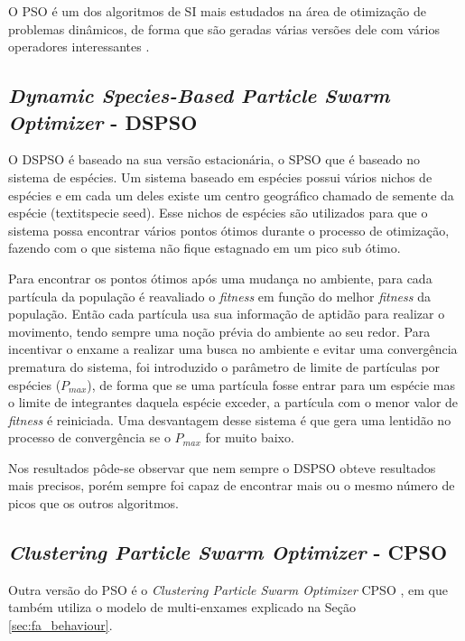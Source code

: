 O PSO é um dos algoritmos de SI mais estudados na área de otimização de problemas dinâmicos, de forma que são geradas várias versões dele com vários operadores interessantes \cite{carlisle2002applying}.

\subsection{\textit{Dynamic Species-Based Particle Swarm Optimizer} - DSPSO}
\label{sec:dspso}

O DSPSO \cite{parrott2006locating} é baseado na sua versão estacionária, o SPSO que é baseado no sistema de espécies. Um sistema baseado em espécies possui vários nichos de espécies e em cada um deles existe um centro geográfico chamado de semente da espécie (textit{specie seed}). Esse nichos de espécies são utilizados para que o sistema possa encontrar vários pontos ótimos durante o processo de otimização, fazendo com o que sistema não fique estagnado em um pico sub ótimo.

Para encontrar os pontos ótimos após uma mudança no ambiente, para cada partícula da população é reavaliado o \textit{fitness} em função do melhor \textit{fitness} da população. Então cada partícula usa sua informação de aptidão para realizar o movimento, tendo sempre uma noção prévia do ambiente ao seu redor. Para incentivar o enxame a realizar uma busca no ambiente e evitar uma convergência prematura do sistema, foi introduzido o parâmetro de limite de partículas por espécies ($P_{max}$), de forma que se uma partícula fosse entrar para um espécie mas o limite de integrantes daquela espécie exceder, a partícula com o menor valor de \textit{fitness} é reiniciada. Uma desvantagem desse sistema é que gera uma lentidão no processo de convergência se o $P_{max}$ for muito baixo.

Nos resultados pôde-se observar que nem sempre o DSPSO obteve resultados mais precisos, porém sempre foi capaz de encontrar mais ou o mesmo número de picos que os outros algoritmos.

\subsection{\textit{Clustering Particle Swarm Optimizer} - CPSO}
\label{sec:cpso}

Outra versão do PSO é o \textit{Clustering Particle Swarm Optimizer} CPSO \cite{yang2010clustering}, em que também utiliza o modelo de multi-enxames explicado na Seção \ref{sec:fa_behaviour}.

